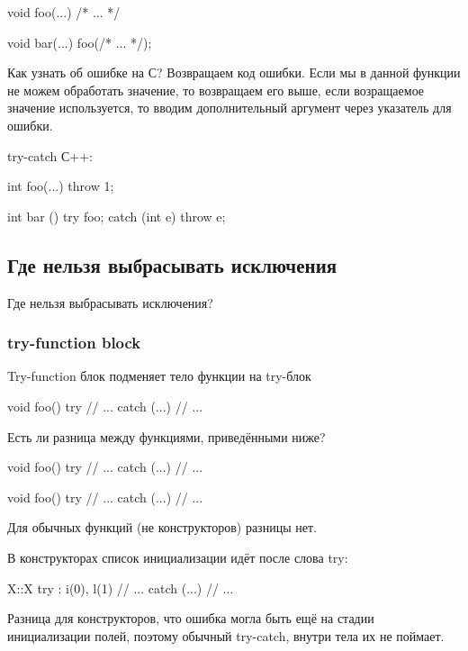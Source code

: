 \begin{cppcode} 
void foo(...) {
    /* ... */
}

void bar(...) {
    foo(/* ... */);
}
\end{cppcode}

Как узнать об ошибке на С? Возвращаем код ошибки. Если мы в данной функции не можем обработать значение, то возвращаем его выше, если возращаемое значение используется, то вводим дополнительный аргумент через указатель для ошибки.

try-catch С++:
\begin{cppcode}
int foo(...) {
    throw 1;
}

int bar () {
    try {
        foo;
    }
    catch (int e){
        throw e;
    }
}
\end{cppcode}

\subsection{Где нельзя выбрасывать исключения}
Где нельзя выбрасывать исключения?

\subsubsection{try-function block}

Try-function блок подменяет тело функции на try-блок

\begin{cppcode}
void foo() try {
    // ...
} catch (...) {
    // ...
}
\end{cppcode}

Есть ли разница между функциями, приведёнными ниже?

\begin{cppcode}
void foo() try {
    // ...
} catch (...) {
    // ...
}

void foo() {
    try {
        // ...
    } catch (...) {
        // ...
    }
}
\end{cppcode}

Для обычных функций (не конструкторов) разницы нет.

В конструкторах список инициализации идёт после слова try:

\begin{cppcode}
X::X try : i(0), l(1) {
    // ...
} catch (...) {
    // ...
}
\end{cppcode}

Разница для конструкторов, что ошибка могла быть ещё на стадии инициализации полей, поэтому обычный try-catch, внутри тела их не поймает.

